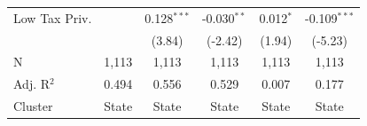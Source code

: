 \begin{tabular*}{\textwidth}{@{\extracolsep{\fill}}lccccc}
   Low Tax Priv.        &                & 0.128$^{***}$  & -0.030$^{**}$  & 0.012$^{*}$ & -0.109$^{***}$\\   
                        &                & (3.84)        & (-2.42)       & (1.94)     & (-5.23)\\   
   \hline
   N         & 1,113          & 1,113          & 1,113          & 1,113       & 1,113\\  
   Adj. R$^2$       & 0.494          & 0.556          & 0.529          & 0.007       & 0.177\\  
   Cluster              & State & State & State & State & State\\  
   \bottomrule
\end{tabular*}
\par\endgroup
